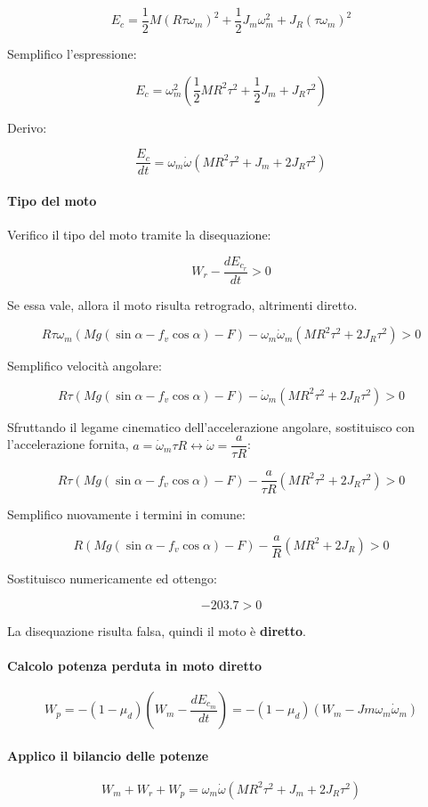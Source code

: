 \documentclass[main.tex]{subfiles}
\begin{document}
\[
	E_c = \dfrac{1}{2}M(R\tau\omega_m)^2 + \dfrac{1}{2}J_m\omega_m^2 + J_R(\tau\omega_m)^2
\]

Semplifico l'espressione:

\[
	E_c = \omega_m^2(\dfrac{1}{2}MR^2\tau^2 + \dfrac{1}{2}J_m + J_R\tau^2)
\]

Derivo:

\[
	\dfrac{E_c}{dt} = \omega_m\dot{\omega}(MR^2\tau^2 + J_m + 2J_R\tau^2)
\]

\paragraph{Tipo del moto}
Verifico il tipo del moto tramite la disequazione:

\[
	W_r - \dfrac{dE_{c_r}}{dt} > 0
\]

Se essa vale, allora il moto risulta retrogrado, altrimenti diretto.

\[
	R\tau\omega_m(Mg(\sin\alpha - f_v\cos\alpha) - F) - \omega_m\dot{\omega}_m(MR^2\tau^2 + 2J_R\tau^2) > 0
\]

Semplifico velocità angolare:

\[
	R\tau(Mg(\sin\alpha - f_v\cos\alpha) - F) - \dot{\omega}_m(MR^2\tau^2 + 2J_R\tau^2) > 0
\]

Sfruttando il legame cinematico dell'accelerazione angolare, sostituisco con l'accelerazione fornita, $a = \dot{\omega}_m\tau R \longleftrightarrow \dot{\omega}=\dfrac{a}{\tau R}$:

\[
	R\tau(Mg(\sin\alpha - f_v\cos\alpha) - F) - \dfrac{a}{\tau R}(MR^2\tau^2 + 2J_R\tau^2) > 0
\]

Semplifico nuovamente i termini in comune:

\[
	R(Mg(\sin\alpha - f_v\cos\alpha) - F) - \dfrac{a}{R}(MR^2 + 2J_R) > 0
\]

Sostituisco numericamente ed ottengo:

\[
	-203.7 > 0
\]

La disequazione risulta falsa, quindi il moto è \textbf{diretto}.

\paragraph{Calcolo potenza perduta in moto diretto}

\[
	W_p = -(1-\mu_d)(W_m - \dfrac{dE_{c_m}}{dt}) = -(1-\mu_d)(W_m - Jm\omega_m\dot{\omega}_m)
\]

\paragraph{Applico il bilancio delle potenze}
\[
	W_m + W_r + W_p = \omega_m\dot{\omega}(MR^2\tau^2 + J_m + 2J_R\tau^2)
\]
\end{document}

